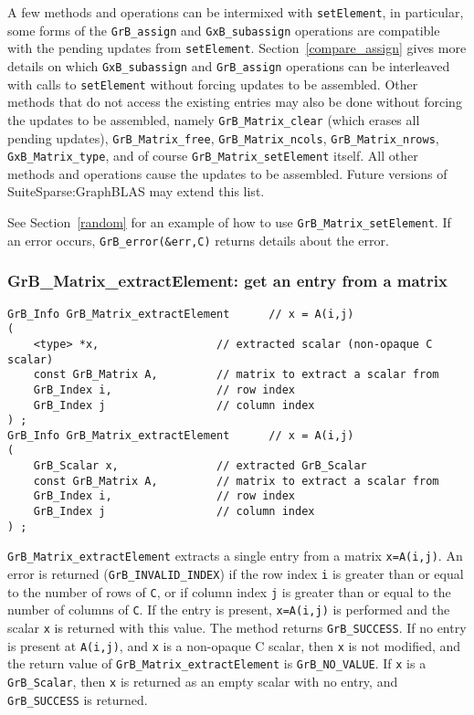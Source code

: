 \documentclass[12pt]{article}
\begin{document}
A few methods and operations can be intermixed with \verb'setElement', in
particular, some forms of the \verb'GrB_assign' and \verb'GxB_subassign'
operations are compatible with the pending updates from \verb'setElement'.
Section~\ref{compare_assign} gives more details on which \verb'GxB_subassign'
and \verb'GrB_assign' operations can be interleaved with calls to
\verb'setElement' without forcing updates to be assembled.  Other methods that
do not access the existing entries may also be done without forcing the updates
to be assembled, namely \verb'GrB_Matrix_clear' (which erases all pending
updates), \verb'GrB_Matrix_free', \verb'GrB_Matrix_ncols',
\verb'GrB_Matrix_nrows', \verb'GxB_Matrix_type', and of course
\verb'GrB_Matrix_setElement' itself.  All other methods and operations cause
the updates to be assembled.  Future versions of SuiteSparse:GraphBLAS may
extend this list.

See Section~\ref{random} for an example of how to use
\verb'GrB_Matrix_setElement'.
If an error occurs, \verb'GrB_error(&err,C)' returns details about the error.

\newpage
\subsubsection{{\sf GrB\_Matrix\_extractElement:} get an entry from a matrix}
\label{matrix_extractElement}

\begin{mdframed}[userdefinedwidth=6in]
{\footnotesize
\begin{verbatim}
GrB_Info GrB_Matrix_extractElement      // x = A(i,j)
(
    <type> *x,                  // extracted scalar (non-opaque C scalar)
    const GrB_Matrix A,         // matrix to extract a scalar from
    GrB_Index i,                // row index
    GrB_Index j                 // column index
) ;
GrB_Info GrB_Matrix_extractElement      // x = A(i,j)
(
    GrB_Scalar x,               // extracted GrB_Scalar
    const GrB_Matrix A,         // matrix to extract a scalar from
    GrB_Index i,                // row index
    GrB_Index j                 // column index
) ;
\end{verbatim} } \end{mdframed}

\verb'GrB_Matrix_extractElement' extracts a single entry from a matrix
\verb'x=A(i,j)'.
An error is returned (\verb'GrB_INVALID_INDEX') if the row index \verb'i' is
greater than or equal to the number of rows of \verb'C', or if column index
\verb'j' is greater than or equal to the number of columns of \verb'C'.
If the entry is present, \verb'x=A(i,j)' is performed and the scalar \verb'x'
is returned with this value.  The method returns \verb'GrB_SUCCESS'.
If no entry is present at \verb'A(i,j)', and \verb'x' is a non-opaque C scalar,
then \verb'x' is not modified, and the return value of
\verb'GrB_Matrix_extractElement' is \verb'GrB_NO_VALUE'.  If \verb'x' is a
\verb'GrB_Scalar', then \verb'x' is returned as an empty scalar with no entry,
and \verb'GrB_SUCCESS' is returned.
\end{document}
